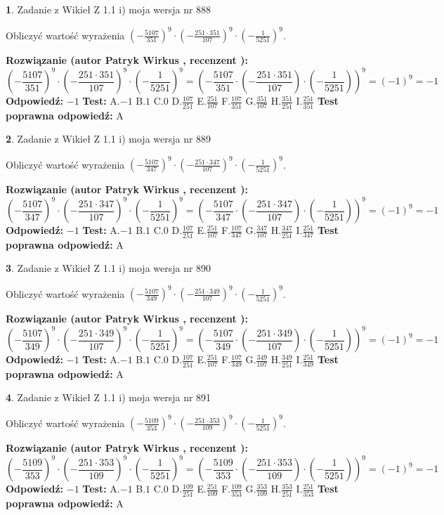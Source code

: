 \documentclass[12pt, a4paper]{article}
\theoremstyle{definition} %
\newtheorem{zad}{}
\newcommand{\zadStart}[1]{\begin{zad}#1\newline}
\newcommand{\zadStop}{\end{zad}}
\newcommand{\rozwStart}[2]{\noindent \textbf{Rozwiązanie (autor #1 , recenzent #2): }\newline}
\newcommand{\rozwStop}{\newline}
\newcommand{\odpStart}{\noindent \textbf{Odpowiedź:}\newline}
\newcommand{\odpStop}{\newline}
\newcommand{\testStart}{\noindent \textbf{Test:}\newline}
\newcommand{\testStop}{\newline}
\newcommand{\kluczStart}{\noindent \textbf{Test poprawna odpowiedź:}\newline}
\newcommand{\kluczStop}{\newline}
\begin{document}
\zadStart{Zadanie z Wikieł Z 1.1 i) moja wersja nr 888}

Obliczyć wartość wyrażenia $(-\frac{5107}{351})^{9} \cdot (-\frac{251 \cdot 351}{107})^{9} \cdot (-\frac{1}{5251})^{9}$.
\zadStop
\rozwStart{Patryk Wirkus}{}
$$(-\frac{5107}{351})^{9} \cdot (-\frac{251 \cdot 351}{107})^{9} \cdot (-\frac{1}{5251})^{9} = (-\frac{5107}{351} \cdot (-\frac{251 \cdot 351}{107}) \cdot (-\frac{1}{5251}))^{9} = (-1)^{9} = -1$$
\rozwStop
\odpStart
$-1$
\odpStop
\testStart
A.$-1$ B.$1$ C.$0$ D.$\frac{107}{251}$ E.$\frac{251}{107}$
F.$\frac{107}{351}$ G.$\frac{351}{107}$
H.$\frac{351}{251}$
I.$\frac{251}{351}$
\testStop
\kluczStart
A
\kluczStop



\zadStart{Zadanie z Wikieł Z 1.1 i) moja wersja nr 889}

Obliczyć wartość wyrażenia $(-\frac{5107}{347})^{9} \cdot (-\frac{251 \cdot 347}{107})^{9} \cdot (-\frac{1}{5251})^{9}$.
\zadStop
\rozwStart{Patryk Wirkus}{}
$$(-\frac{5107}{347})^{9} \cdot (-\frac{251 \cdot 347}{107})^{9} \cdot (-\frac{1}{5251})^{9} = (-\frac{5107}{347} \cdot (-\frac{251 \cdot 347}{107}) \cdot (-\frac{1}{5251}))^{9} = (-1)^{9} = -1$$
\rozwStop
\odpStart
$-1$
\odpStop
\testStart
A.$-1$ B.$1$ C.$0$ D.$\frac{107}{251}$ E.$\frac{251}{107}$
F.$\frac{107}{347}$ G.$\frac{347}{107}$
H.$\frac{347}{251}$
I.$\frac{251}{347}$
\testStop
\kluczStart
A
\kluczStop



\zadStart{Zadanie z Wikieł Z 1.1 i) moja wersja nr 890}

Obliczyć wartość wyrażenia $(-\frac{5107}{349})^{9} \cdot (-\frac{251 \cdot 349}{107})^{9} \cdot (-\frac{1}{5251})^{9}$.
\zadStop
\rozwStart{Patryk Wirkus}{}
$$(-\frac{5107}{349})^{9} \cdot (-\frac{251 \cdot 349}{107})^{9} \cdot (-\frac{1}{5251})^{9} = (-\frac{5107}{349} \cdot (-\frac{251 \cdot 349}{107}) \cdot (-\frac{1}{5251}))^{9} = (-1)^{9} = -1$$
\rozwStop
\odpStart
$-1$
\odpStop
\testStart
A.$-1$ B.$1$ C.$0$ D.$\frac{107}{251}$ E.$\frac{251}{107}$
F.$\frac{107}{349}$ G.$\frac{349}{107}$
H.$\frac{349}{251}$
I.$\frac{251}{349}$
\testStop
\kluczStart
A
\kluczStop



\zadStart{Zadanie z Wikieł Z 1.1 i) moja wersja nr 891}

Obliczyć wartość wyrażenia $(-\frac{5109}{353})^{9} \cdot (-\frac{251 \cdot 353}{109})^{9} \cdot (-\frac{1}{5251})^{9}$.
\zadStop
\rozwStart{Patryk Wirkus}{}
$$(-\frac{5109}{353})^{9} \cdot (-\frac{251 \cdot 353}{109})^{9} \cdot (-\frac{1}{5251})^{9} = (-\frac{5109}{353} \cdot (-\frac{251 \cdot 353}{109}) \cdot (-\frac{1}{5251}))^{9} = (-1)^{9} = -1$$
\rozwStop
\odpStart
$-1$
\odpStop
\testStart
A.$-1$ B.$1$ C.$0$ D.$\frac{109}{251}$ E.$\frac{251}{109}$
F.$\frac{109}{353}$ G.$\frac{353}{109}$
H.$\frac{353}{251}$
I.$\frac{251}{353}$
\testStop
\kluczStart
A
\kluczStop
\end{document}
